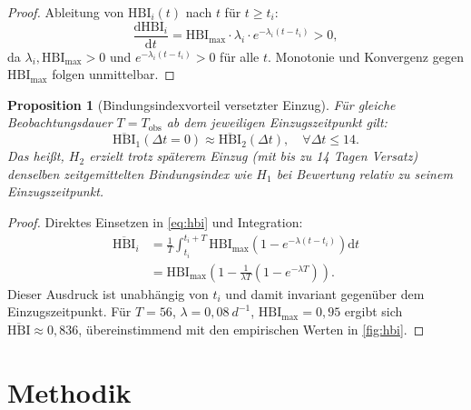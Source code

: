 ﻿\documentclass[12pt, a4paper]{article}
\theoremstyle{plain}
\newtheorem{proposition}[theorem]{Proposition}
\theoremstyle{definition}
\theoremstyle{remark}
\newcommand{\HBI}{\mathrm{HBI}}
\newcommand{\dt}{\Delta t}
\begin{document}
\begin{proof}
Ableitung von $\HBI_i(t)$ nach $t$ für $t \geq t_i$:
\begin{equation}
  \frac{\mathrm{d}\HBI_i}{\mathrm{d}t} = \HBI_{\mathrm{max}} \cdot \lambda_i \cdot e^{-\lambda_i(t-t_i)} > 0,
\end{equation}
da $\lambda_i, \HBI_{\mathrm{max}} > 0$ und $e^{-\lambda_i(t-t_i)} > 0$ für alle $t$.
Monotonie und Konvergenz gegen $\HBI_{\mathrm{max}}$ folgen unmittelbar.
\end{proof}

\begin{proposition}[Bindungsindexvorteil versetzter Einzug]\label{pro:hbivorteil}
Für gleiche Beobachtungsdauer $T = T_{\mathrm{obs}}$ ab dem jeweiligen
Einzugszeitpunkt gilt:
\begin{equation}
  \overline{\HBI}_1(\dt=0) \approx \overline{\HBI}_2(\dt), \quad \forall \dt \leq 14.
\end{equation}
Das heißt, $H_2$ erzielt trotz späterem Einzug (mit bis zu 14 Tagen Versatz)
denselben zeitgemittelten Bindungsindex wie $H_1$ bei Bewertung relativ zu
seinem Einzugszeitpunkt.
\end{proposition}

\begin{proof}
Direktes Einsetzen in \cref{eq:hbi} und Integration:
\begin{align}
  \overline{\HBI}_i &= \frac{1}{T} \int_{t_i}^{t_i+T} \HBI_{\max}\left(1 - e^{-\lambda(t-t_i)}\right)\mathrm{d}t\\
  &= \HBI_{\max}\left(1 - \frac{1}{\lambda T}\left(1 - e^{-\lambda T}\right)\right).
\end{align}
Dieser Ausdruck ist unabhängig von $t_i$ und damit invariant gegenüber dem
Einzugszeitpunkt. Für $T = 56$, $\lambda = 0{,}08\ \si{d^{-1}}$,
$\HBI_{\max} = 0{,}95$ ergibt sich $\overline{\HBI} \approx 0{,}836$, übereinstimmend
mit den empirischen Werten in \cref{fig:hbi}.
\end{proof}

\section{Methodik}
\label{sec:methodik}
\end{document}
